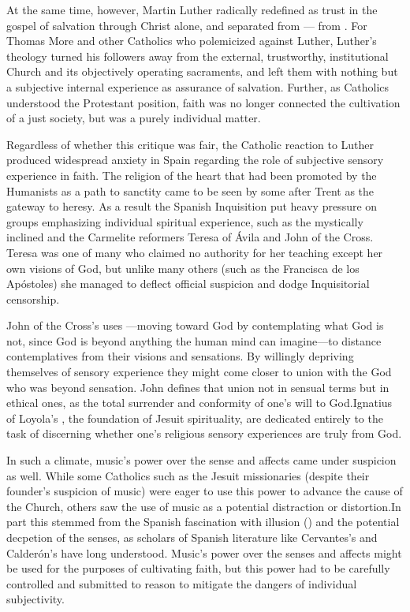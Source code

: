 At the same time, however, Martin Luther radically redefined  as trust in the gospel of salvation through Christ alone, and separated  from --- from .
For Thomas More and other Catholics who polemicized against Luther, Luther's theology turned his followers away from the external, trustworthy, institutional Church and its objectively operating sacraments, and left them with nothing but a subjective internal experience as assurance of salvation.%
  \autocite[\XXX, also More]{Schreiner:Certainty}
Further, as Catholics understood the Protestant position, faith was no longer connected the cultivation of a just society, but was a purely individual matter.

Regardless of whether this critique was fair, the Catholic reaction to Luther produced widespread anxiety in Spain regarding the role of subjective sensory experience in faith.
The religion of the heart that had been promoted by the Humanists as a path to sanctity came to be seen by some after Trent as the gateway to heresy.\citXXX{}
As a result the Spanish Inquisition put heavy pressure on groups emphasizing individual spiritual experience, such as the mystically inclined  and the Carmelite reformers Teresa of Ávila and John of the Cross.
Teresa was one of many who claimed no authority for her teaching except her own visions of God, but unlike many others (such as the  Francisca de los Apóstoles) she managed to deflect official suspicion and dodge Inquisitorial censorship.%
  \autocites[\XXX]{Ahlgren:TeresaPolitics}{Francisca:Inquisition}

John of the Cross's  uses ---moving toward God by contemplating what God is not, since God is beyond anything the human mind can imagine---to distance contemplatives from their visions and sensations.
By willingly depriving themselves of sensory experience they might come closer to union with the God who was beyond sensation.
John defines that union not in sensual terms but in ethical ones, as the total surrender and conformity of one's will to God.
Ignatius of Loyola's , the foundation of Jesuit spirituality, are dedicated entirely to the task of discerning whether one's religious sensory experiences are truly from God.\citXXX{}

In such a climate, music's power over the sense and affects came under suspicion as well.
While some Catholics such as the Jesuit missionaries (despite their founder's suspicion of music) were eager to use this power to advance the cause of the Church, others saw the use of music as a potential distraction or distortion.\citXXX[who?]
In part this stemmed from the Spanish fascination with illusion () and the potential decpetion of the senses, as scholars of Spanish literature like Cervantes's  and Calderón's  have long understood.\citXXX{}
Music's power over the senses and affects might be used for the purposes of cultivating faith, but this power had to be carefully controlled and submitted to reason to mitigate the dangers of individual subjectivity.


